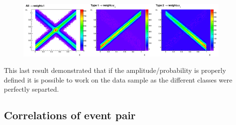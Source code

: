 \begin{figure}[!htb]
\centering
\includegraphics[width=0.95\textwidth]{../png/figRecoCorr.png}
\caption{}
\label{fig:RecoEx2}
\end{figure}

This last result demonstrated that if the amplitude/probability is properly
defined it is possible to work on the data sample as the different classes were
perfectly separted.


\subsection{Correlations of event pair}

\newpage
